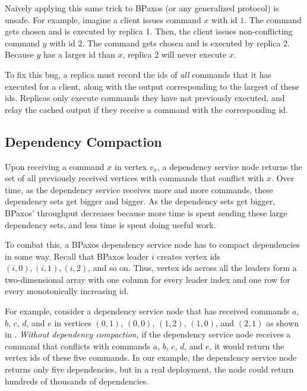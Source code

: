 Naively applying this same trick to BPaxos (or any generalized protocol) is
unsafe. For example, imagine a client issues command $x$ with id $1$. The
command gets chosen and is executed by replica 1. Then, the client issues
non-conflicting command $y$ with id $2$. The command gets chosen and is
executed by replica 2. Because $y$ has a larger id than $x$, replica 2 will
never execute $x$.

To fix this bug, a replica must record the ids of \emph{all} commands that it
has executed for a client, along with the output corresponding to the largest
of these ids. Replicas only execute commands they have not previously executed,
and relay the cached output if they receive a command with the corresponding
id.


\subsection{Dependency Compaction}
Upon receiving a command $x$ in vertex $v_x$, a dependency service node returns
the set of all previously received vertices with commands that conflict with
$x$. Over time, as the dependency service receives more and more commands,
these dependency sets get bigger and bigger. As the dependency sets get bigger,
BPaxos' throughput decreases because more time is spent sending these large
dependency sets, and less time is spent doing useful work.

To combat this, a BPaxos dependency service node has to compact dependencies in
some way. Recall that BPaxos leader $i$ creates vertex ids $(i, 0), (i, 1), (i,
2)$, and so on. Thus, vertex ids across all the leaders form a two-dimensional
array with one column for every leader index and one row for every
monotonically increasing id.

{}

For example, consider a dependency service node that has received commands $a$,
$b$, $c$, $d$, and $e$ in vertices $(0, 1)$, $(0, 0)$, $(1, 2)$, $(1, 0)$, and
$(2, 1)$ as shown in . \emph{Without dependency
compaction}, if the dependency service node receives a command that conflicts
with commands $a$, $b$, $c$, $d$, and $e$, it would return the vertex ids of
these five commands. In our example, the dependency service node returns only
five dependencies, but in a real deployment, the node could return hundreds of
thousands of dependencies.

